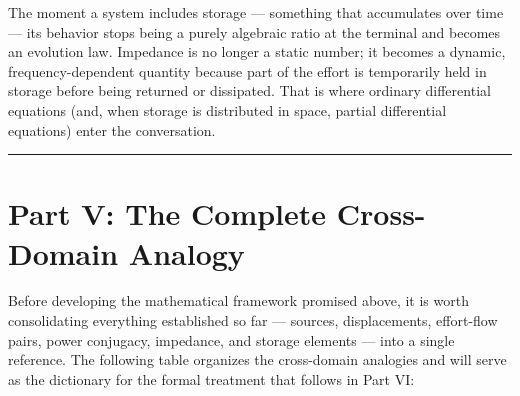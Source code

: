 \documentclass[
  letterpaper,
  DIV=11,
  numbers=noendperiod]{scrartcl}
\begin{document}
The moment a system includes storage --- something that accumulates over
time --- its behavior stops being a purely algebraic ratio at the
terminal and becomes an evolution law. Impedance is no longer a static
number; it becomes a dynamic, frequency-dependent quantity because part
of the effort is temporarily held in storage before being returned or
dissipated. That is where ordinary differential equations (and, when
storage is distributed in space, partial differential equations) enter
the conversation.

\begin{center}\rule{0.5\linewidth}{0.5pt}\end{center}

\section{Part V: The Complete Cross-Domain
Analogy}\label{part-v-the-complete-cross-domain-analogy}

Before developing the mathematical framework promised above, it is worth
consolidating everything established so far --- sources, displacements,
effort-flow pairs, power conjugacy, impedance, and storage elements ---
into a single reference. The following table organizes the cross-domain
analogies and will serve as the dictionary for the formal treatment that
follows in Part VI:
\end{document}
